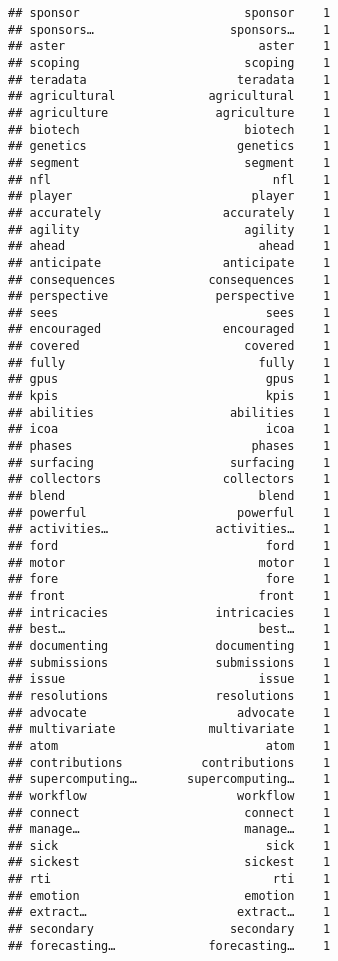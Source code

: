 \documentclass[]{article}
\begin{document}
\begin{verbatim}
## sponsor                       sponsor    1
## sponsors…                   sponsors…    1
## aster                           aster    1
## scoping                       scoping    1
## teradata                     teradata    1
## agricultural             agricultural    1
## agriculture               agriculture    1
## biotech                       biotech    1
## genetics                     genetics    1
## segment                       segment    1
## nfl                               nfl    1
## player                         player    1
## accurately                 accurately    1
## agility                       agility    1
## ahead                           ahead    1
## anticipate                 anticipate    1
## consequences             consequences    1
## perspective               perspective    1
## sees                             sees    1
## encouraged                 encouraged    1
## covered                       covered    1
## fully                           fully    1
## gpus                             gpus    1
## kpis                             kpis    1
## abilities                   abilities    1
## icoa                             icoa    1
## phases                         phases    1
## surfacing                   surfacing    1
## collectors                 collectors    1
## blend                           blend    1
## powerful                     powerful    1
## activities…               activities…    1
## ford                             ford    1
## motor                           motor    1
## fore                             fore    1
## front                           front    1
## intricacies               intricacies    1
## best…                           best…    1
## documenting               documenting    1
## submissions               submissions    1
## issue                           issue    1
## resolutions               resolutions    1
## advocate                     advocate    1
## multivariate             multivariate    1
## atom                             atom    1
## contributions           contributions    1
## supercomputing…       supercomputing…    1
## workflow                     workflow    1
## connect                       connect    1
## manage…                       manage…    1
## sick                             sick    1
## sickest                       sickest    1
## rti                               rti    1
## emotion                       emotion    1
## extract…                     extract…    1
## secondary                   secondary    1
## forecasting…             forecasting…    1

\end{verbatim}
\end{document}
